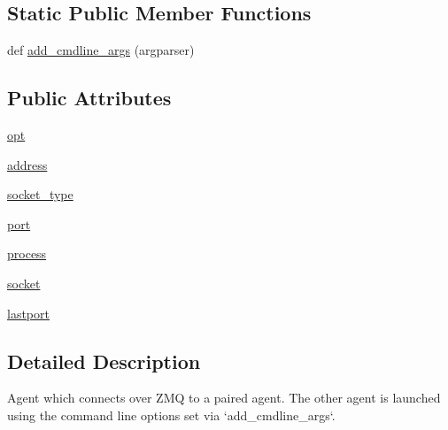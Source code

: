 \subsection*{Static Public Member Functions}
\begin{DoxyCompactItemize}
\item 
def \hyperlink{classparlai_1_1agents_1_1remote__agent_1_1remote__agent_1_1RemoteAgentAgent_ae58e61ee7d8f6373b38389b2e832924b}{add\+\_\+cmdline\+\_\+args} (argparser)
\end{DoxyCompactItemize}
\subsection*{Public Attributes}
\begin{DoxyCompactItemize}
\item 
\hyperlink{classparlai_1_1agents_1_1remote__agent_1_1remote__agent_1_1RemoteAgentAgent_a7b880694aee36d8e2cafb3e53a705a82}{opt}
\item 
\hyperlink{classparlai_1_1agents_1_1remote__agent_1_1remote__agent_1_1RemoteAgentAgent_a7d776b862be52c47de9abb90337e939f}{address}
\item 
\hyperlink{classparlai_1_1agents_1_1remote__agent_1_1remote__agent_1_1RemoteAgentAgent_abcfa336c759d372ad870812bb5ca7dab}{socket\+\_\+type}
\item 
\hyperlink{classparlai_1_1agents_1_1remote__agent_1_1remote__agent_1_1RemoteAgentAgent_aa5ae1ef2a79cff29a766747676e32d08}{port}
\item 
\hyperlink{classparlai_1_1agents_1_1remote__agent_1_1remote__agent_1_1RemoteAgentAgent_afd5b2a4e559fc5a8acbaa6194d4159d5}{process}
\item 
\hyperlink{classparlai_1_1agents_1_1remote__agent_1_1remote__agent_1_1RemoteAgentAgent_a84599f42b9453b6d39279fbbca160737}{socket}
\item 
\hyperlink{classparlai_1_1agents_1_1remote__agent_1_1remote__agent_1_1RemoteAgentAgent_a8be1cf54b584d1b2fbaaf02a5b9d81a0}{lastport}
\end{DoxyCompactItemize}


\subsection{Detailed Description}
\begin{DoxyVerb}Agent which connects over ZMQ to a paired agent. The other agent is
launched using the command line options set via `add_cmdline_args`.\end{DoxyVerb}
 

